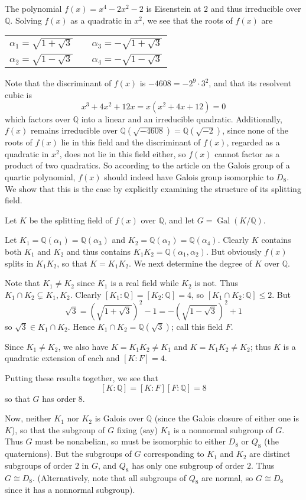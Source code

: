 \documentclass[12pt]{article}
\DeclareMathOperator{\Gal}{Gal}
\newcommand{\Rats}{\mathbb{Q}}
\begin{document}
The polynomial $f(x)=x^4-2x^2-2$ is Eisenstein at $2$ and thus irreducible over $\Rats$. Solving $f(x)$ as a quadratic in $x^2$, we see that the roots of $f(x)$ are
\begin{center}
\begin{tabular}{ccc}
$\alpha_1 = \sqrt{1+\sqrt{3}}$ &\qquad & $\alpha_3 = -\sqrt{1+\sqrt{3}}$ \\
$\alpha_2 = \sqrt{1-\sqrt{3}}$ &\qquad & $\alpha_4 = -\sqrt{1-\sqrt{3}}$
\end{tabular}
\end{center}

Note that the discriminant of $f(x)$ is $-4608=-2^9\cdot 3^2$, and that its resolvent cubic is
\[x^3+4x^2+12x=x(x^2+4x+12)=0\]
which factors over $\Rats$ into a linear and an irreducible quadratic. Additionally, $f(x)$ remains irreducible over $\Rats(\sqrt{-4608})=\Rats(\sqrt{-2})$, since none of the roots of $f(x)$ lie in this field and the discriminant of $f(x)$, regarded as a quadratic in $x^2$, does not lie in this field either, so $f(x)$ cannot factor as a product of two quadratics. So according to the article on the Galois group of a quartic polynomial, $f(x)$ should indeed have Galois group isomorphic to $D_8$. We show that this is the case by explicitly examining the structure of its splitting field. 

Let $K$ be the splitting field of $f(x)$ over $\Rats$, and let $G=\Gal(K/\Rats)$.

Let $K_1=\Rats(\alpha_1) = \Rats(\alpha_3)$ and $K_2 = \Rats(\alpha_2)=\Rats(\alpha_4)$. Clearly $K$ contains both $K_1$ and $K_2$ and thus contains $K_1K_2=\Rats(\alpha_1,\alpha_2)$. But obviously $f(x)$ splits in $K_1K_2$, so that $K=K_1K_2$. We next determine the degree of $K$ over $\Rats$.

Note that $K_1\neq K_2$ since $K_1$ is a real field while $K_2$ is not. Thus $K_1\cap K_2\subsetneq K_1, K_2$. Clearly $[K_1:\Rats]=[K_2:\Rats]=4$, so $[K_1\cap K_2:\Rats]\leq 2$. But
\[\sqrt{3}=\left(\sqrt{1+\sqrt{3}}\right)^2-1 = -\left(\sqrt{1-\sqrt{3}}\right)^2+1\]
so $\sqrt{3}\in K_1\cap K_2$. Hence $K_1\cap K_2=\Rats(\sqrt{3})$; call this field $F$.

Since $K_1\neq K_2$, we also have $K=K_1K_2\neq K_1$ and $K=K_1K_2\neq K_2$; thus $K$ is a quadratic extension of each and $[K:F]=4$.

Putting these results together, we see that
\[[K:\Rats]=[K:F][F:\Rats]=8\]
so that $G$ has order $8$.

Now, neither $K_1$ nor $K_2$ is Galois over $\Rats$ (since the Galois closure of either one is $K$), so that the subgroup of $G$ fixing (say) $K_1$ is a nonnormal subgroup of $G$. Thus $G$ must be nonabelian, so must be isomorphic to either $D_8$ or $Q_8$ (the quaternions). But the subgroups of $G$ corresponding to $K_1$ and $K_2$ are distinct subgroups of order $2$ in $G$, and $Q_8$ has only one subgroup of order $2$. Thus $G\cong D_8$. (Alternatively, note that all subgroups of $Q_8$ are normal, so $G\cong D_8$ since it has a nonnormal subgroup).
\end{document}
